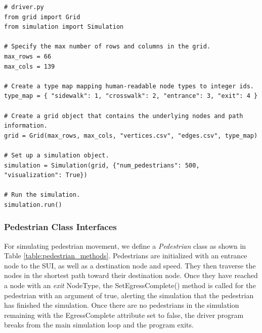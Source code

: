 \documentclass[12pt]{article}
\begin{document}
\begin{lstlisting}
# driver.py
from grid import Grid
from simulation import Simulation

# Specify the max number of rows and columns in the grid.
max_rows = 66
max_cols = 139

# Create a type map mapping human-readable node types to integer ids.
type_map = { "sidewalk": 1, "crosswalk": 2, "entrance": 3, "exit": 4 }

# Create a grid object that contains the underlying nodes and path information.
grid = Grid(max_rows, max_cols, "vertices.csv", "edges.csv", type_map)

# Set up a simulation object.
simulation = Simulation(grid, {"num_pedestrians": 500, "visualization": True})

# Run the simulation.
simulation.run()
\end{lstlisting}

\subsubsection{Pedestrian Class Interfaces}
For simulating pedestrian movement, we define a \textit{Pedestrian} class as
shown in Table \ref{table:pedestrian_methods}. Pedestrians are initialized with
an entrance node to the SUI, as well as a destination node and speed. They then
traverse the nodes in the shortest path toward their destination node. Once
they have reached a node with an \textit{exit} NodeType, the
SetEgressComplete() method is called for the pedestrian with an argument of
true, alerting the simulation that the pedestrian has finished the simulation.
Once there are no pedestrians in the simulation remaining with the
EgressComplete attribute set to false, the driver program breaks from the main
simulation loop and the program exits.
\end{document}
